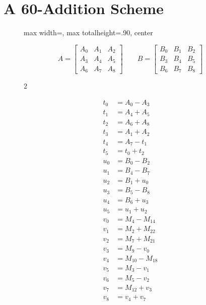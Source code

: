 \documentclass[11pt]{article}
\begin{document}
\clearpage

\FloatBarrier                          %

\section{A 60-Addition Scheme}
\label{sec:latex-algo}

\begin{figure}[H]                      %
  \centering
  \begin{adjustbox}{max width=\textwidth,
                    max totalheight=.90\textheight,   %
                    center}
    \begin{minipage}{\linewidth}
\footnotesize      %

\[
A=\begin{bmatrix}
A_{0}&A_{1}&A_{2}\\
A_{3}&A_{4}&A_{5}\\
A_{6}&A_{7}&A_{8}
\end{bmatrix}\qquad
B=\begin{bmatrix}
B_{0}&B_{1}&B_{2}\\
B_{3}&B_{4}&B_{5}\\
B_{6}&B_{7}&B_{8}
\end{bmatrix}
\]

\begin{multicols}{2}

\begin{align*}
t_{0} &= A_{0}-A_{3}\\
t_{1}&=A_{4}+A_{5}\\
t_{2}&=A_{6}+A_{8}\\
t_{3}&=A_{1}+A_{2}\\
t_{4}&=A_{7}-t_{1}\\
t_{5}&=t_{0}+t_{2}\\
u_{0}&=B_{0}-B_{2}\\
u_{1}&=B_{4}-B_{7}\\
u_{2}&=B_{1}+u_{0}\\
u_{3}&=B_{5}-B_{8}\\
u_{4}&=B_{6}+u_{3}\\
u_{5}&=u_{1}+u_{2}\\
v_{0}&=M_{4}-M_{14}\\
v_{1}&=M_{2}+M_{22}\\
v_{2}&=M_{7}+M_{21}\\
v_{3}&=M_{9}-v_{0}\\
v_{4}&=M_{10}-M_{18}\\
v_{5}&=M_{3}-v_{1}\\
v_{6}&=M_{5}-v_{2}\\
v_{7}&=M_{12}+v_{3}\\
v_{8}&=v_{4}+v_{7}
\end{align*}


\end{multicols}
\end{minipage}
\end{adjustbox}
\end{figure}
\end{document}
